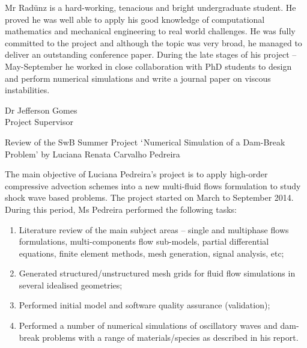 \documentclass[14pt,twoside]{report}
\begin{document}
Mr Rad\"unz is a hard-working, tenacious and bright undergraduate student. He proved he was well able to apply his good knowledge of computational mathematics and mechanical engineering to real world challenges. He was fully committed to the project and although the topic was very broad, he managed to deliver an outstanding conference paper. During the late stages of his project -- May-September he worked in close collaboration with PhD students to design and perform numerical simulations and write a journal paper on viscous instabilities. 
\begin{center}
{Dr Jefferson Gomes}\\
{Project Supervisor}\\
\end{center}



\clearpage



\medskip

\begin{center}
{\Large Review of the SwB Summer Project $\lq$Numerical Simulation of a Dam-Break Problem' by Luciana Renata Carvalho Pedreira}
\end{center}

The main objective of Luciana Pedreira's project is to apply high-order compressive advection schemes into a new multi-fluid flows formulation to study shock wave based problems. The project started on March to September 2014. During this period, Ms Pedreira performed the following tasks:
\begin{enumerate}
\item Literature review of the main subject areas -- single and multiphase flows formulations, multi-components flow sub-models, partial differential equations, finite element methods, mesh generation, signal analysis, etc;
\item Generated structured/unstructured mesh grids for fluid flow simulations in several idealised geometries;
\item Performed initial model and software quality assurance (validation);
\item Performed a number of numerical simulations of oscillatory waves and dam-break problems with a range of materials/species as described in his report. 
\end{enumerate} 
\end{document}
